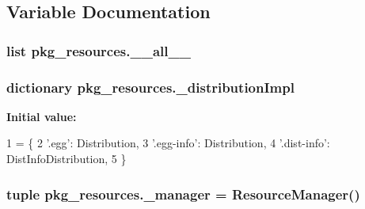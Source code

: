 \subsection{Variable Documentation}
\hypertarget{namespacepkg__resources_a43c5447133cb244ad4d7947989de78d1}{}
\subsubsection[{\+\_\+\+\_\+all\+\_\+\+\_\+}]{\setlength{\rightskip}{0pt plus 5cm}list pkg\+\_\+resources.\+\_\+\+\_\+all\+\_\+\+\_\+}\label{namespacepkg__resources_a43c5447133cb244ad4d7947989de78d1}
\hypertarget{namespacepkg__resources_aad2eda4b879b00de50473c3c5c8b62c9}{}
\subsubsection[{\+\_\+distribution\+Impl}]{\setlength{\rightskip}{0pt plus 5cm}dictionary pkg\+\_\+resources.\+\_\+distribution\+Impl}\label{namespacepkg__resources_aad2eda4b879b00de50473c3c5c8b62c9}
{\bfseries Initial value\+:}
\begin{DoxyCode}
1 = \{
2     \textcolor{stringliteral}{'.egg'}: Distribution,
3     \textcolor{stringliteral}{'.egg-info'}: Distribution,
4     \textcolor{stringliteral}{'.dist-info'}: DistInfoDistribution,
5     \}
\end{DoxyCode}
\hypertarget{namespacepkg__resources_a0fe769980e5a33eee090ffbb7a7663ff}{}
\subsubsection[{\+\_\+manager}]{\setlength{\rightskip}{0pt plus 5cm}tuple pkg\+\_\+resources.\+\_\+manager = {\bf Resource\+Manager}()}\label{namespacepkg__resources_a0fe769980e5a33eee090ffbb7a7663ff}
\hypertarget{namespacepkg__resources_a6be66cecb4a61efdf49afce30b661e2b}{}
